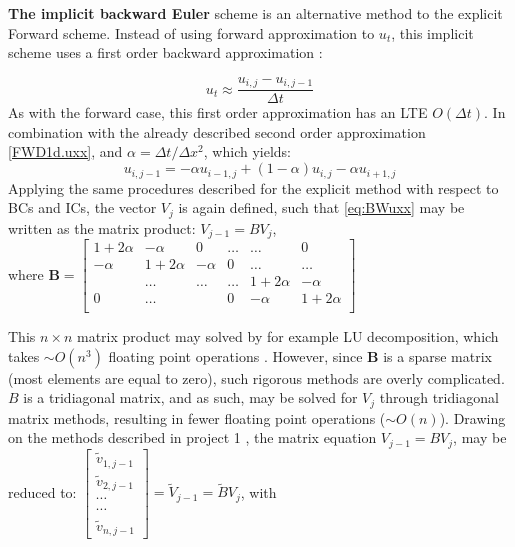 \documentclass[%
oneside,                 %
final,                   %
10pt]{article}
\begin{document}
\textbf{The implicit backward Euler} scheme is an alternative method to the explicit Forward scheme. Instead of using forward  approximation to $u_{t}$, this implicit scheme uses a first order backward approximation \citep[308]{HJ15}:

\begin{equation}
u_{t} \approx \frac{u_{i,j}- u_{i,j-1}}{\Delta t} \label{BW.ut}
\end{equation}
As with the forward case, this first order approximation has an LTE $O(\Delta t)$. In combination with the already described second order approximation \eqref{FWD1d.uxx}, and $\alpha=\Delta t/\Delta  x^2$, which yields:
\begin{equation}
u_{i,j-1}=-\alpha u_{i-1,j}+(1-\alpha)u_{i,j}-\alpha u_{i+1,j} \label{eq:BWuxx}
\end{equation}
Applying the same procedures described for the explicit method with respect to BCs and ICs, the vector $V_{j}$ is again defined, such that \eqref{eq:BWuxx} may be written as the matrix product:
$V_{j-1}=BV_j$,\\
where
$\textbf{B}=  \begin{bmatrix}
                           1+2\alpha & -\alpha & 0 &\dots   & \dots &0 \\
                           -\alpha & 1+2\alpha  &  -\alpha &0 &\dots &\dots \\
                           & \dots   & \dots &\dots   &1+2\alpha & -\alpha \\
                      
                           0&\dots    &  & 0  &-\alpha & 1+2\alpha \\
              			\end{bmatrix}$ 
\newline

This $n \times n$ matrix product may solved by for example LU decomposition, which takes $\sim O(n^3)$ floating point operations \citep[173]{HJ15}. However, since \textbf{B} is a sparse matrix (most elements are equal to zero), such rigorous methods are overly complicated. $B$ is a tridiagonal matrix, and as such, may be solved for $V_j$ through tridiagonal matrix methods, resulting in fewer floating point operations ($\sim O(n)$). Drawing on the methods described in project 1 \cite{P1}, the matrix equation $V_{j-1}=BV_j$, may be reduced to: \newline
$\begin{bmatrix} \tilde{v}_{1,j-1} \\ \tilde{v}_{2,j-1}\\ \cdots \\ \cdots \\ \tilde{v}_{n,j-1}\end{bmatrix}=\tilde{V}_{j-1}=\tilde{B}V_j$, with
\end{document}
